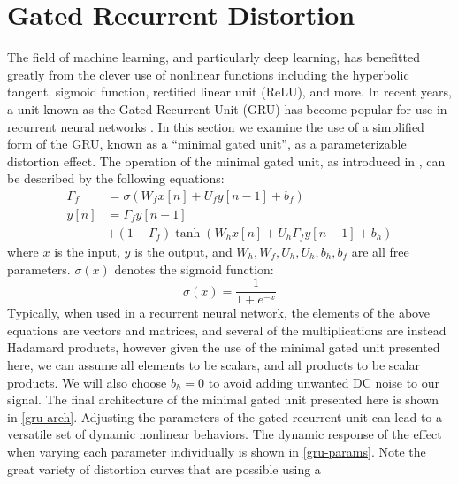 \documentclass[twoside,a4paper]{article}
\begin{document}
\section{Gated Recurrent Distortion} \label{sec:GRU}
%
The field of machine learning, and particularly deep learning, has benefitted
greatly from the clever use of nonlinear functions including the hyperbolic
tangent, sigmoid function, rectified linear unit (ReLU), and more.
In recent years, a unit known as the Gated Recurrent Unit (GRU) has become
popular for use in recurrent neural networks \cite{gru_original}. In this
section we examine the use of a simplified form of the GRU, known as a
``minimal gated unit'', as a parameterizable distortion effect.
\newline\newline
The operation of the minimal gated unit, as introduced in
\cite{minimal-gated-unit}, can be described by the following equations:
%
\begin{equation}
    \begin{split}
        \Gamma_f &= \sigma (W_f x[n] + U_f y[n-1] + b_f) \\
        y[n] &= \Gamma_f y[n-1] \\
             &+ (1 - \Gamma_f) \tanh (W_h x[n] + U_h \Gamma_f y[n-1] + b_h)
    \end{split}
    \label{eq:minimal-gated-unit}
\end{equation}
%
where $x$ is the input, $y$ is the output, and $W_h,W_f,U_h,U_h,b_h,b_f$
are all free parameters. $\sigma(x)$ denotes the sigmoid function:
%
\begin{equation}
    \sigma(x) = \frac{1}{1 + e^{-x}}
    \label{eq:sigmoid}
\end{equation}
%
Typically, when used in a recurrent neural network, the elements of the
above equations are vectors and matrices, and several of the multiplications
are instead Hadamard products, however given the use of the minimal gated
unit presented here, we can assume all elements to be scalars, and all
products to be scalar products. We will also choose $b_h=0$ to avoid
adding unwanted DC noise to our signal. The final architecture of the
minimal gated unit presented here is shown in \cref{gru-arch}.
\newline\newline
Adjusting the parameters of the gated recurrent unit can lead to a versatile
set of dynamic nonlinear behaviors. The dynamic response of the effect
when varying each parameter individually is shown in \cref{gru-params}.
Note the great variety of distortion curves that are possible using a
\end{document}
